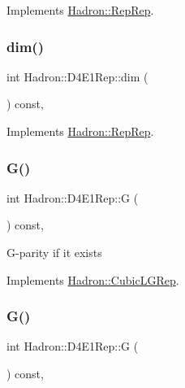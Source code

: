 Implements \mbox{\hyperlink{structHadron_1_1RepRep_a92c8802e5ed7afd7da43ccfd5b7cd92b}{Hadron\+::\+Rep\+Rep}}.

\mbox{\label{structHadron_1_1D4E1Rep_a4e11b2eaec3c949ef3d8b7c391078e84}} 
\subsubsection{\texorpdfstring{dim()}{dim()}\hspace{0.1cm}{\footnotesize\ttfamily [3/3]}}
{\footnotesize\ttfamily int Hadron\+::\+D4\+E1\+Rep\+::dim (\begin{DoxyParamCaption}{ }\end{DoxyParamCaption}) const\hspace{0.3cm}{\ttfamily [inline]}, {\ttfamily [virtual]}}



Implements \mbox{\hyperlink{structHadron_1_1RepRep_a92c8802e5ed7afd7da43ccfd5b7cd92b}{Hadron\+::\+Rep\+Rep}}.

\mbox{\label{structHadron_1_1D4E1Rep_a3fe4ce9de97d3cece000be10562653f7}} 
\subsubsection{\texorpdfstring{G()}{G()}\hspace{0.1cm}{\footnotesize\ttfamily [1/2]}}
{\footnotesize\ttfamily int Hadron\+::\+D4\+E1\+Rep\+::G (\begin{DoxyParamCaption}{ }\end{DoxyParamCaption}) const\hspace{0.3cm}{\ttfamily [inline]}, {\ttfamily [virtual]}}

G-\/parity if it exists 

Implements \mbox{\hyperlink{structHadron_1_1CubicLGRep_ace26f7b2d55e3a668a14cb9026da5231}{Hadron\+::\+Cubic\+L\+G\+Rep}}.

\mbox{\label{structHadron_1_1D4E1Rep_a3fe4ce9de97d3cece000be10562653f7}} 
\subsubsection{\texorpdfstring{G()}{G()}\hspace{0.1cm}{\footnotesize\ttfamily [2/2]}}
{\footnotesize\ttfamily int Hadron\+::\+D4\+E1\+Rep\+::G (\begin{DoxyParamCaption}{ }\end{DoxyParamCaption}) const\hspace{0.3cm}{\ttfamily [inline]}, {\ttfamily [virtual]}}

